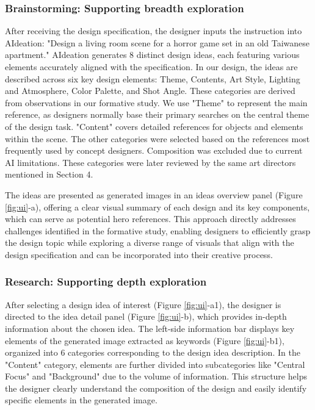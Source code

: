 \subsubsection{Brainstorming: Supporting breadth exploration}
After receiving the design specification, the designer inputs the instruction into AIdeation: "Design a living room scene for a horror game set in an old Taiwanese apartment." AIdeation generates 8 distinct design ideas, each featuring various elements accurately aligned with the specification. In our design, the ideas are described across six key design elements: Theme, Contents, Art Style, Lighting and Atmosphere, Color Palette, and Shot Angle. These categories are derived from observations in our formative study. We use "Theme" to represent the main reference, as designers normally base their primary searches on the central theme of the design task. "Content" covers detailed references for objects and elements within the scene. The other categories were selected based on the references most frequently used by concept designers. Composition was excluded due to current AI limitations. These categories were later reviewed by the same art directors mentioned in Section 4.



The ideas are presented as generated images in an ideas overview panel (Figure \ref{fig:ui}-a), offering a clear visual summary of each design and its key components, which can serve as potential hero references. This approach directly addresses challenges identified in the formative study, enabling designers to efficiently grasp the design topic while exploring a diverse range of visuals that align with the design specification and can be incorporated into their creative process.

\subsubsection{Research: Supporting depth exploration}
After selecting a design idea of interest (Figure \ref{fig:ui}-a1), the designer is directed to the idea detail panel (Figure \ref{fig:ui}-b), which provides in-depth information about the chosen idea. The left-side information bar displays key elements of the generated image extracted as keywords (Figure \ref{fig:ui}-b1), organized into 6 categories corresponding to the design idea description. In the "Content" category, elements are further divided into subcategories like "Central Focus" and "Background" due to the volume of information. This structure helps the designer clearly understand the composition of the design and easily identify specific elements in the generated image.

